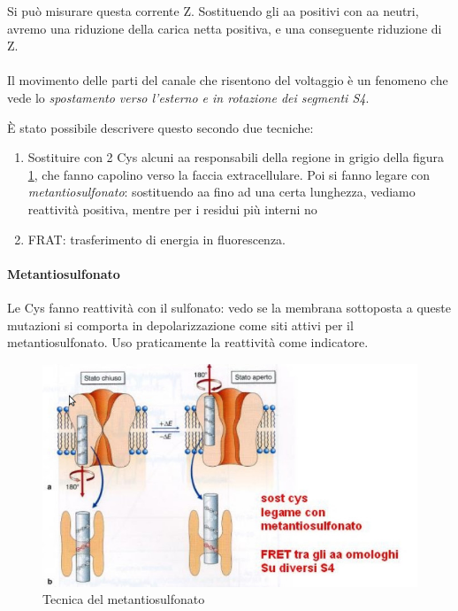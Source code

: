 \documentclass[a4paper,12pt]{article}
\begin{document}
Si può misurare questa corrente Z. Sostituendo gli aa positivi con aa neutri, avremo una riduzione della carica netta positiva, e una conseguente riduzione di Z.
\paragraph{}
Il movimento delle parti del canale che risentono del voltaggio è un fenomeno che vede lo \emph{spostamento verso l'esterno e in rotazione dei segmenti S4}.

È stato possibile descrivere questo secondo due tecniche:
\begin{enumerate}
\item{Sostituire con 2 Cys alcuni aa responsabili della regione in grigio della figura \ref{img:met}, che fanno capolino verso la faccia extracellulare. Poi si fanno legare con \emph{metantiosulfonato}: sostituendo aa fino ad una certa lunghezza, vediamo reattività positiva, mentre per i residui più interni no}
\item{FRAT: trasferimento di energia in fluorescenza.}
\end{enumerate}

\paragraph{Metantiosulfonato}

Le Cys fanno reattività con il sulfonato: vedo se la membrana sottoposta a queste mutazioni si comporta in depolarizzazione come siti attivi per il metantiosulfonato. Uso praticamente la reattività come indicatore.

\begin{figure}[H]
\centering
\includegraphics[scale=0.4]{immagine/metantio.jpg}
\caption{Tecnica del metantiosulfonato}
\label{img:met}
\end{figure} 
\end{document}
